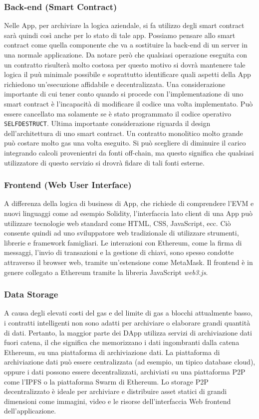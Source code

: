 \subsubsection{Back-end (Smart Contract)}
Nelle \DH App, per archiviare la logica aziendale, si fa utilizzo degli smart contract sarà quindi così anche per lo stato di tale app. Possiamo pensare allo smart contract come quella componente che va a sostituire la back-end di un server in una normale applicazione. Da notare però che qualsiasi operazione eseguita con un contratto risulterà molto costosa per questo motivo si dovrà mantenere tale logica il puù minimale possibile e  soprattutto identificare quali aspetti della \DH App richiedono un'esecuzione affidabile e decentralizzata. Una considerazione importante di cui tener conto quando si procede con l'implementazione di uno smart contract è l'incapacità di modificare il codice una volta implementato. Può essere cancellato ma solamente se è stato programmato il codice operativo \lstinline|SELFDESTRUCT|. Ultima importante considerazione riguarda il design dell'architettura di uno smart contract. Un contratto monolitico molto grande può costare molto gas una volta eseguito. Si può scegliere di diminuire il carico integrando calcoli provenientri da fonti off-chain, ma questo significa che qualsiasi utilizzatore di questo servizio si drovrà fidare di tali fonti esterne.

\subsubsection{Frontend (Web User Interface)}
A differenza della logica di business di \DH App, che richiede di comprendere l'EVM e nuovi linguaggi come ad esempio Solidity, l'interfaccia lato client di una \DH App può utilizzare tecnologie web standard come HTML, CSS, JavaScript, ecc. Ciò consente quindi ad uno sviluppatore web tradizionale di utilizzare strumenti, librerie e framework famigliari. Le interazioni con Ethereum, come la firma di messaggi, l'invio di transazioni e la gestione di chiavi, sono spesso condotte attraverso il browser web, tramite un'estensione come MetaMask. Il frontend è in genere collegato a Ethereum tramite la libreria JavaScript \textit{web3.js}. 

\subsubsection{Data Storage}
A causa degli elevati costi del gas e del limite di gas a blocchi attualmente basso, i contratti intelligenti non sono adatti per archiviare o elaborare grandi quantità di dati. Pertanto, la maggior parte dei DApp utilizza servizi di archiviazione dati fuori catena, il che significa che memorizzano i dati ingombranti dalla catena Ethereum, su una piattaforma di archiviazione dati. La piattaforma di archiviazione dati può essere centralizzata (ad esempio, un tipico database cloud), oppure i dati possono essere decentralizzati, archiviati su una piattaforma P2P come l'IPFS o la piattaforma Swarm di Ethereum.
Lo storage P2P decentralizzato è ideale per archiviare e distribuire asset statici di grandi dimensioni come immagini, video e le risorse dell'interfaccia Web frontend dell'applicazione.

